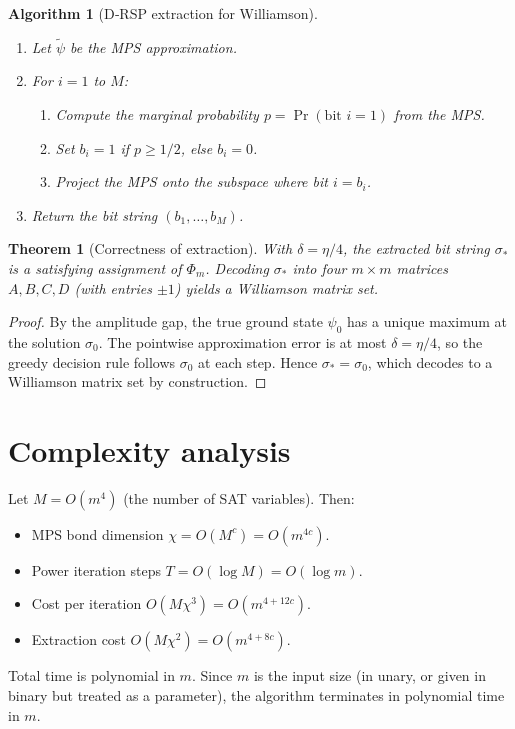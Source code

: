 \documentclass[11pt,a4paper]{article}
\newtheorem{theorem}{Theorem}[section]
\newtheorem{algorithm}{Algorithm}[section]
\begin{document}
\begin{algorithm}[D‑RSP extraction for Williamson]\label{alg:drsp}
\begin{enumerate}
\item Let $\tilde{\psi}$ be the MPS approximation.
\item For $i = 1$ to $M$:
   \begin{enumerate}
   \item Compute the marginal probability $p = \Pr(\text{bit } i = 1)$ from the MPS.
   \item Set $b_i = 1$ if $p \ge 1/2$, else $b_i = 0$.
   \item Project the MPS onto the subspace where bit $i = b_i$.
   \end{enumerate}
\item Return the bit string $(b_1,\dots,b_M)$.
\end{enumerate}
\end{algorithm}

\begin{theorem}[Correctness of extraction]\label{thm:drsp}
With $\delta = \eta/4$, the extracted bit string $\sigma_*$ is a satisfying assignment of $\Phi_m$. Decoding $\sigma_*$ into four $m\times m$ matrices $A,B,C,D$ (with entries $\pm1$) yields a Williamson matrix set.
\end{theorem}
\begin{proof}
By the amplitude gap, the true ground state $\psi_0$ has a unique maximum at the solution $\sigma_0$. The pointwise approximation error is at most $\delta = \eta/4$, so the greedy decision rule follows $\sigma_0$ at each step. Hence $\sigma_* = \sigma_0$, which decodes to a Williamson matrix set by construction.
\end{proof}

\section{Complexity analysis}

Let $M = O(m^4)$ (the number of SAT variables). Then:
\begin{itemize}
\item MPS bond dimension $\chi = O(M^c) = O(m^{4c})$.
\item Power iteration steps $T = O(\log M) = O(\log m)$.
\item Cost per iteration $O(M\chi^3) = O(m^{4+12c})$.
\item Extraction cost $O(M\chi^2) = O(m^{4+8c})$.
\end{itemize}
Total time is polynomial in $m$. Since $m$ is the input size (in unary, or given in binary but treated as a parameter), the algorithm terminates in polynomial time in $m$.
\end{document}
